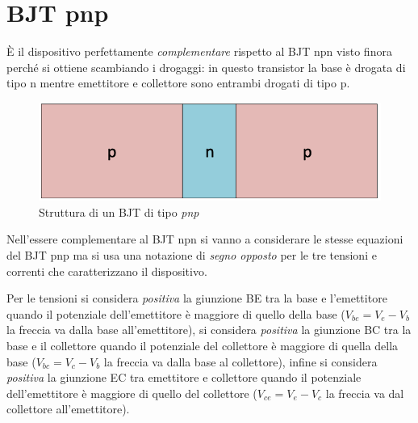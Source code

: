 \documentclass[12pt, a4paper]{report}
\begin{document}
\section{BJT pnp}
È il dispositivo perfettamente \textit{complementare} rispetto al BJT npn visto finora perché si ottiene scambiando i drogaggi: in questo transistor la base è drogata di tipo n mentre emettitore e collettore sono entrambi drogati di tipo p.
\begin{figure}[h]
    \centering
    \includegraphics[scale=0.45,angle=0]{bjt_pnp.png}
    \caption{Struttura di un BJT di tipo \textit{pnp}}
\end{figure}

Nell'essere complementare al BJT npn si vanno a considerare le stesse equazioni del BJT pnp ma si usa una notazione di \textit{segno opposto} per le tre tensioni e correnti che caratterizzano il dispositivo.

Per le tensioni si considera \textit{positiva} la giunzione BE tra la base e l'emettitore quando il potenziale dell'emettitore è maggiore di quello della base ($V_{be} = V_{e} - V_{b}$ la freccia va dalla base all'emettitore), si considera \textit{positiva} la giunzione BC tra la base e il collettore quando il potenziale del collettore è maggiore di quella della base ($V_{bc} = V_{c} - V_{b}$ la freccia va dalla base al collettore), infine si considera \textit{positiva} la giunzione EC tra emettitore e collettore quando il potenziale dell'emettitore è maggiore di quello del collettore ($V_{ce} = V_{e} - V_{c}$ la freccia va dal collettore all'emettitore).
\end{document}
